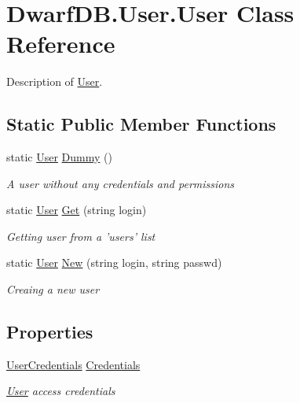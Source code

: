 \hypertarget{class_dwarf_d_b_1_1_user_1_1_user}{\section{Dwarf\+D\+B.\+User.\+User Class Reference}
\label{class_dwarf_d_b_1_1_user_1_1_user}
}


Description of \hyperlink{class_dwarf_d_b_1_1_user_1_1_user}{User}.  


\subsection*{Static Public Member Functions}
\begin{DoxyCompactItemize}
\item 
static \hyperlink{class_dwarf_d_b_1_1_user_1_1_user}{User} \hyperlink{class_dwarf_d_b_1_1_user_1_1_user_acea2310c87e9c0606c9ee370e5946ea9}{Dummy} ()
\begin{DoxyCompactList}\small\item\em A user without any credentials and permissions \end{DoxyCompactList}\item 
static \hyperlink{class_dwarf_d_b_1_1_user_1_1_user}{User} \hyperlink{class_dwarf_d_b_1_1_user_1_1_user_ac068cb4562e69335c64c250eeb45236f}{Get} (string login)
\begin{DoxyCompactList}\small\item\em Getting user from a 'users' list \end{DoxyCompactList}\item 
static \hyperlink{class_dwarf_d_b_1_1_user_1_1_user}{User} \hyperlink{class_dwarf_d_b_1_1_user_1_1_user_a93f68285e63485ad34640eb15019793b}{New} (string login, string passwd)
\begin{DoxyCompactList}\small\item\em Creaing a new user \end{DoxyCompactList}\end{DoxyCompactItemize}
\subsection*{Properties}
\begin{DoxyCompactItemize}
\item 
\hyperlink{class_dwarf_d_b_1_1_user_1_1_user_credentials}{User\+Credentials} \hyperlink{class_dwarf_d_b_1_1_user_1_1_user_ab59cfb6b9b4044adc4f20bb342bd0eef}{Credentials}
\begin{DoxyCompactList}\small\item\em \hyperlink{class_dwarf_d_b_1_1_user_1_1_user}{User} access credentials \end{DoxyCompactList}\end{DoxyCompactItemize}



